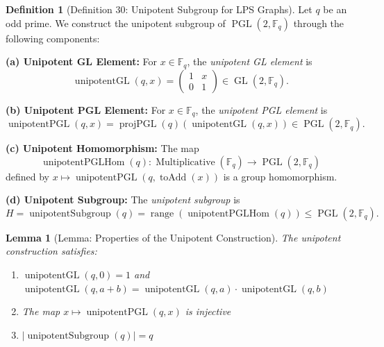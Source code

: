 \documentclass[11pt]{article}
\theoremstyle{plain}
\newtheorem*{lemma}{Lemma}
\theoremstyle{definition}
\newtheorem*{definition}{Definition}
\theoremstyle{remark}
\begin{document}
\begin{definition}[Definition 30: Unipotent Subgroup for LPS Graphs]
Let $q$ be an odd prime. We construct the unipotent subgroup of $\operatorname{PGL}(2, \mathbb{F}_q)$ through the following components:

\textbf{(a) Unipotent GL Element:} For $x \in \mathbb{F}_q$, the \emph{unipotent GL element} is
\[
  \operatorname{unipotentGL}(q, x) = \begin{pmatrix} 1 & x \\ 0 & 1 \end{pmatrix} \in \operatorname{GL}(2, \mathbb{F}_q).
\]

\textbf{(b) Unipotent PGL Element:} For $x \in \mathbb{F}_q$, the \emph{unipotent PGL element} is
\[
  \operatorname{unipotentPGL}(q, x) = \operatorname{projPGL}(q)(\operatorname{unipotentGL}(q, x)) \in \operatorname{PGL}(2, \mathbb{F}_q).
\]

\textbf{(c) Unipotent Homomorphism:} The map
\[
  \operatorname{unipotentPGLHom}(q) : \operatorname{Multiplicative}(\mathbb{F}_q) \to \operatorname{PGL}(2, \mathbb{F}_q)
\]
defined by $x \mapsto \operatorname{unipotentPGL}(q, \operatorname{toAdd}(x))$ is a group homomorphism.

\textbf{(d) Unipotent Subgroup:} The \emph{unipotent subgroup} is
\[
  H = \operatorname{unipotentSubgroup}(q) = \operatorname{range}(\operatorname{unipotentPGLHom}(q)) \leq \operatorname{PGL}(2,\mathbb{F}_q).
\]
\end{definition}

\begin{lemma}[Lemma: Properties of the Unipotent Construction]
The unipotent construction satisfies:
\begin{enumerate}
\item $\operatorname{unipotentGL}(q, 0) = 1$ and $\operatorname{unipotentGL}(q, a + b) = \operatorname{unipotentGL}(q, a) \cdot \operatorname{unipotentGL}(q, b)$
\item The map $x \mapsto \operatorname{unipotentPGL}(q, x)$ is injective
\item $|\operatorname{unipotentSubgroup}(q)| = q$
\end{enumerate}
\end{lemma}
\end{document}
